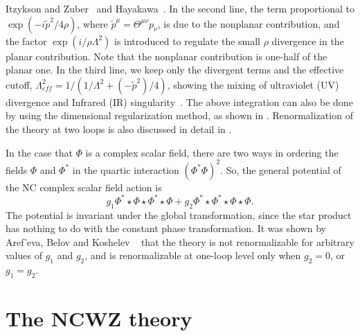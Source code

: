 \documentclass[a4paper,a4paper]{article}
\begin{document}
Itzykson and Zuber~\cite{IZu} and Hayakawa~\cite{Hayakawa}. In the second line, the term 
proportional to $\exp\left(-i\tilde{p}^2/4\rho\right)$, where
$\tilde{p}^\mu=\Theta^{\mu\nu}p_\nu$, is due to the nonplanar contribution, and the 
factor $\exp\left(i/\rho\Lambda^2\right)$ is introduced to regulate the small 
$\rho$ divergence in the planar contribution. Note that the nonplanar contribution 
is one-half of the planar one. In the third line, we keep only the divergent terms and 
the effective cutoff, $\Lambda_{eff}^2 = 1/\left(1/\Lambda^2+(-\tilde{p}^2)/4\right)$,
showing the mixing of ultraviolet (UV) divergence and Infrared (IR) singularity~\cite{MRS}. 
The above integration can also be done by using the dimensional regularization method, 
as shown in \cite{ABK1}. Renormalization of the theory at two loops is also discussed in 
detail in \cite{AM}. 

In the case that $\Phi$ is a complex scalar field, there are two ways in ordering the 
fields $\Phi$ and $\Phi^\ast$ in the quartic interaction $(\Phi^\ast\Phi)^2$. So, the 
general potential of the NC complex scalar field action is 
$$g_1\Phi^\ast\star\Phi\star\Phi^\ast\star\Phi+g_2\Phi^\ast\star\Phi^\ast\star\Phi\star\Phi.
$$
The potential is invariant under the global transformation, 
since the star product has nothing to 
do with the constant phase transformation. It was shown by Aref'eva, Belov and Koshelev
~\cite{ABK2} that the theory is not 
renormalizable for arbitrary values of $g_1$ and $g_2$, and is renormalizable at one-loop 
level only when $g_2=0$, or $g_1=g_2$.

\section{The NCWZ theory}
\end{document}
